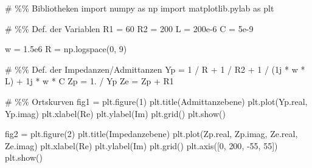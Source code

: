 \documentclass[
  ngerman,
  letterpaper,
]{scrbook}
\newenvironment{Shaded}{}{}
\newcommand{\CommentTok}[1]{\textcolor[rgb]{0.42,0.45,0.49}{#1}}
\newcommand{\DecValTok}[1]{\textcolor[rgb]{0.00,0.36,0.77}{#1}}
\newcommand{\FloatTok}[1]{\textcolor[rgb]{0.00,0.36,0.77}{#1}}
\newcommand{\ImportTok}[1]{\textcolor[rgb]{0.01,0.18,0.38}{#1}}
\newcommand{\NormalTok}[1]{\textcolor[rgb]{0.14,0.16,0.18}{#1}}
\newcommand{\OperatorTok}[1]{\textcolor[rgb]{0.14,0.16,0.18}{#1}}
\newcommand{\OtherTok}[1]{\textcolor[rgb]{0.44,0.26,0.76}{#1}}
\newcommand{\StringTok}[1]{\textcolor[rgb]{0.01,0.18,0.38}{#1}}
\begin{document}
\begin{Shaded}
\begin{Highlighting}[]
\CommentTok{\# \%\% Bibliotheken}
\ImportTok{import}\NormalTok{ numpy }\ImportTok{as}\NormalTok{ np}
\ImportTok{import}\NormalTok{ matplotlib.pylab }\ImportTok{as}\NormalTok{ plt}

\CommentTok{\# \%\% Def. der Variablen}
\NormalTok{R1 }\OperatorTok{=} \DecValTok{60}
\NormalTok{R2 }\OperatorTok{=} \DecValTok{200}
\NormalTok{L }\OperatorTok{=} \FloatTok{200e{-}6}
\NormalTok{C }\OperatorTok{=} \FloatTok{5e{-}9}

\NormalTok{w }\OperatorTok{=} \FloatTok{1.5e6}
\NormalTok{R }\OperatorTok{=}\NormalTok{ np.logspace(}\DecValTok{0}\NormalTok{, }\DecValTok{9}\NormalTok{)}

\CommentTok{\# \%\% Def. der Impedanzen/Admittanzen}
\NormalTok{Yp }\OperatorTok{=} \DecValTok{1} \OperatorTok{/}\NormalTok{ R }\OperatorTok{+} \DecValTok{1} \OperatorTok{/}\NormalTok{ R2 }\OperatorTok{+} \DecValTok{1} \OperatorTok{/}\NormalTok{ (}\OtherTok{1j} \OperatorTok{*}\NormalTok{ w }\OperatorTok{*}\NormalTok{ L) }\OperatorTok{+} \OtherTok{1j} \OperatorTok{*}\NormalTok{ w }\OperatorTok{*}\NormalTok{ C}
\NormalTok{Zp }\OperatorTok{=} \FloatTok{1.} \OperatorTok{/}\NormalTok{ Yp}
\NormalTok{Ze }\OperatorTok{=}\NormalTok{ Zp }\OperatorTok{+}\NormalTok{ R1}

\CommentTok{\# \%\% Ortskurven}
\NormalTok{fig1 }\OperatorTok{=}\NormalTok{ plt.figure(}\DecValTok{1}\NormalTok{)}
\NormalTok{plt.title(}\StringTok{\textquotesingle{}Admittanzebene\textquotesingle{}}\NormalTok{)}
\NormalTok{plt.plot(Yp.real, Yp.imag)}
\NormalTok{plt.xlabel(}\StringTok{\textquotesingle{}Re\textquotesingle{}}\NormalTok{)}
\NormalTok{plt.ylabel(}\StringTok{\textquotesingle{}Im\textquotesingle{}}\NormalTok{)}
\NormalTok{plt.grid()}
\NormalTok{plt.show()}

\NormalTok{fig2 }\OperatorTok{=}\NormalTok{ plt.figure(}\DecValTok{2}\NormalTok{)}
\NormalTok{plt.title(}\StringTok{\textquotesingle{}Impedanzebene\textquotesingle{}}\NormalTok{)}
\NormalTok{plt.plot(Zp.real, Zp.imag, Ze.real, Ze.imag)}
\NormalTok{plt.xlabel(}\StringTok{\textquotesingle{}Re\textquotesingle{}}\NormalTok{)}
\NormalTok{plt.ylabel(}\StringTok{\textquotesingle{}Im\textquotesingle{}}\NormalTok{)}
\NormalTok{plt.grid()}
\NormalTok{plt.axis([}\DecValTok{0}\NormalTok{, }\DecValTok{200}\NormalTok{, }\OperatorTok{{-}}\DecValTok{55}\NormalTok{, }\DecValTok{55}\NormalTok{])}
\NormalTok{plt.show()}
\end{Highlighting}
\end{Shaded}
\end{document}
